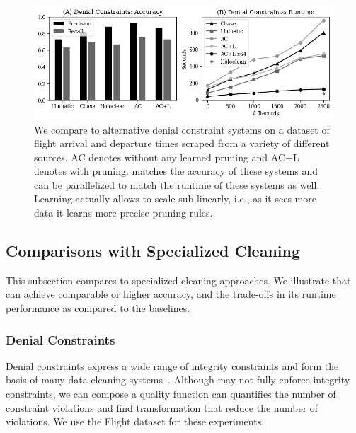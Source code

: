 


\begin{figure}
    \centering
    \includegraphics[width=\columnwidth]{exp/exp1.png}
    \caption{We compare \sys to alternative denial constraint systems on a dataset of flight arrival and departure times scraped from a variety of different sources. AC denotes \sys without any learned pruning and AC+L denotes \sys with pruning.
    \sys matches the accuracy of these systems and can be parallelized to match the runtime of these systems as well. Learning actually allows \sys to scale sub-linearly, i.e., as it sees more data it learns more precise pruning rules.\label{exp1a}}
\end{figure}

\subsection{Comparisons with Specialized Cleaning}
This subsection compares \sys to specialized cleaning approaches.  We illustrate that \sys can achieve comparable or higher accuracy, and the trade-offs in its runtime performance as compared to the baselines.

\subsubsection{Denial Constraints}
Denial constraints express a wide range of integrity constraints and form the basis of many data cleaning systems~\cite{llunatic,chase,holoclean}.  Although \sys may not fully enforce integrity constraints, we can compose a quality function can quantifies the number of constraint violations and find transformation that reduce the number of violations.    We use the Flight dataset for these experiments.

